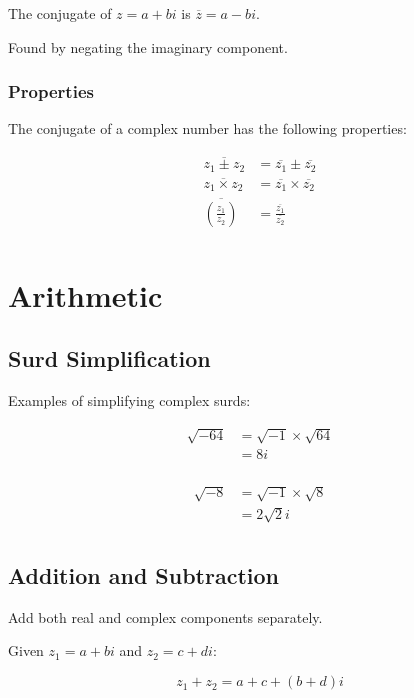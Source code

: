 \documentclass[a4paper,11pt]{report}
\begin{document}
The conjugate of $z = a + bi$ is $\overline{z} = a - bi$.

Found by negating the imaginary component.

\subsubsection{Properties}

The conjugate of a complex number has the following properties:

$$
\begin{aligned}
\overline{z_1 \pm z_2} & = \overline{z_1} \pm \overline{z_2} \\
\overline{z_1 \times z_2} & = \overline{z_1} \times \overline{z_2} \\
\overline{(\frac{z_1}{z_2})} & = \frac{\overline{z_1}}{\overline{z_2}} \\
\end{aligned}
$$


\section{Arithmetic}

\subsection{Surd Simplification}

Examples of simplifying complex surds:

$$
\begin{aligned}
\sqrt{-64} & = \sqrt{-1} \times \sqrt{64} \\
& = 8i \\
\end{aligned}
$$

$$
\begin{aligned}
\sqrt{-8} & = \sqrt{-1} \times \sqrt{8} \\
& = 2 \sqrt{2} i \\
\end{aligned}
$$

\subsection{Addition and Subtraction}

Add both real and complex components separately.

Given $z_1 = a + bi$ and $z_2 = c + di$:

$$
z_1 + z_2 = a + c + (b + d)i
$$
\end{document}
